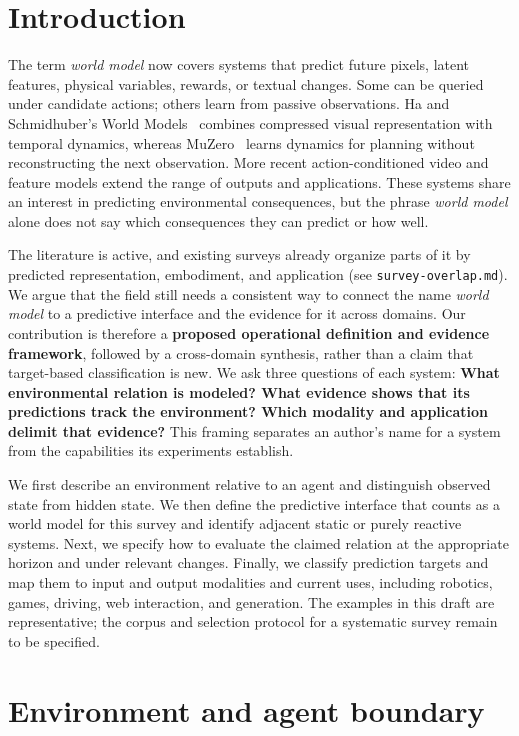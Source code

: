 \IfFileExists{IEEEtran.cls}{\documentclass[journal]{IEEEtran}}{\documentclass[twocolumn]{article}}
\begin{document}
\section{Introduction}\label{introduction}

The term \emph{world model} now covers systems that predict future pixels, latent features, physical variables, rewards, or textual changes. Some can be queried under candidate actions; others learn from passive observations. Ha and Schmidhuber's World Models~\cite{ref1} combines compressed visual representation with temporal dynamics, whereas MuZero~\cite{ref2} learns dynamics for planning without reconstructing the next observation. More recent action-conditioned video and feature models extend the range of outputs and applications. These systems share an interest in predicting environmental consequences, but the phrase \emph{world model} alone does not say which consequences they can predict or how well.

The literature is active, and existing surveys already organize parts of it by predicted representation, embodiment, and application (see \texttt{survey-overlap.md}). We argue that the field still needs a consistent way to connect the name \emph{world model} to a predictive interface and the evidence for it across domains. Our contribution is therefore a \textbf{proposed operational definition and evidence framework}, followed by a cross-domain synthesis, rather than a claim that target-based classification is new. We ask three questions of each system: \textbf{What environmental relation is modeled? What evidence shows that its predictions track the environment? Which modality and application delimit that evidence?} This framing separates an author's name for a system from the capabilities its experiments establish.

We first describe an environment relative to an agent and distinguish observed state from hidden state. We then define the predictive interface that counts as a world model for this survey and identify adjacent static or purely reactive systems. Next, we specify how to evaluate the claimed relation at the appropriate horizon and under relevant changes. Finally, we classify prediction targets and map them to input and output modalities and current uses, including robotics, games, driving, web interaction, and generation. The examples in this draft are representative; the corpus and selection protocol for a systematic survey remain to be specified.

\section{Environment and agent boundary}\label{environment-and-agent-boundary}
\end{document}
